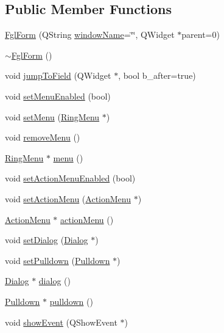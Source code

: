 \subsection*{Public Member Functions}
\begin{DoxyCompactItemize}
\item 
\hyperlink{classFglForm_a4a6d10fc6cce5a7984d59b80730cd7e1}{FglForm} (QString \hyperlink{classFglForm_a154084978ed81b8739db7197541881f5}{windowName}=\char`\"{}\char`\"{}, QWidget $\ast$parent=0)
\item 
\hyperlink{classFglForm_a14fc02c52beeeffefa92a4b3425da772}{$\sim$FglForm} ()
\item 
void \hyperlink{classFglForm_a626014edfd45271d30f38d877601abd5}{jumpToField} (QWidget $\ast$, bool b\_\-after=true)
\item 
void \hyperlink{classFglForm_acfb920aa37d488d2877fe75441ac7f65}{setMenuEnabled} (bool)
\item 
void \hyperlink{classFglForm_a0060da33eb1943f1b762e8a164ede398}{setMenu} (\hyperlink{classRingMenu}{RingMenu} $\ast$)
\item 
void \hyperlink{classFglForm_a7b0af358781bf6b0f37d80e9383cf10e}{removeMenu} ()
\item 
\hyperlink{classRingMenu}{RingMenu} $\ast$ \hyperlink{classFglForm_acffbcaf62fc53ff47363cf13b2967242}{menu} ()
\item 
void \hyperlink{classFglForm_ab322288b13021e7b98a5cf87912d2f18}{setActionMenuEnabled} (bool)
\item 
void \hyperlink{classFglForm_acdc54b976403abededb061ba2dd0c30f}{setActionMenu} (\hyperlink{classActionMenu}{ActionMenu} $\ast$)
\item 
\hyperlink{classActionMenu}{ActionMenu} $\ast$ \hyperlink{classFglForm_aa7339ffc3aa81015c493104643fde6a1}{actionMenu} ()
\item 
void \hyperlink{classFglForm_aee2921f4bcb8f95e10fde25ec84842d3}{setDialog} (\hyperlink{classDialog}{Dialog} $\ast$)
\item 
void \hyperlink{classFglForm_a19892721571e2c56399ca6be07c3f750}{setPulldown} (\hyperlink{classPulldown}{Pulldown} $\ast$)
\item 
\hyperlink{classDialog}{Dialog} $\ast$ \hyperlink{classFglForm_ace102516f1523e1ea87c64f2db1ea30e}{dialog} ()
\item 
\hyperlink{classPulldown}{Pulldown} $\ast$ \hyperlink{classFglForm_a05f163612a936468e8fac3e84aeec02e}{pulldown} ()
\item 
void \hyperlink{classFglForm_a81b6a444e67df3a3e56ff786fe9099b7}{showEvent} (QShowEvent $\ast$)

\end{DoxyCompactItemize}
